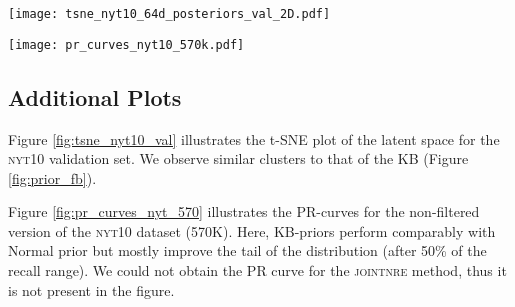 \documentclass[11pt]{article}
\begin{document}
\begin{figure*}[t!]
    \centering
    \begin{minipage}[c]{0.45\textwidth}
    \texttt{[image: tsne\_nyt10\_64d\_posteriors\_val\_2D.pdf]}
    \caption{t-SNE plot of the latent vector () for the \textsc{nyt10} (520K) validation set, when using KB priors during training.}
    \label{fig:tsne_nyt10_val}
    \end{minipage}\hspace{0.05\linewidth}
    \begin{minipage}[c]{0.45\textwidth}
\texttt{[image: pr\_curves\_nyt10\_570k.pdf]}
    \caption{Precision-Recall curves for the \textsc{nyt10} (570K) test set.}
    \label{fig:pr_curves_nyt_570}
    \end{minipage}
\end{figure*}


\subsection{Additional Plots}
\label{app:more_plots}

Figure \ref{fig:tsne_nyt10_val} illustrates the t-SNE plot of the latent space for the \textsc{nyt10} validation set. We observe similar clusters to that of the KB (Figure \ref{fig:prior_fb}).

Figure \ref{fig:pr_curves_nyt_570} illustrates the PR-curves for the non-filtered version of the \textsc{nyt10} dataset (570K). Here, KB-priors perform comparably with Normal prior but mostly improve the tail of the distribution (after 50\% of the recall range). We could not obtain the PR curve for the \textsc{jointnre} method, thus it is not present in the figure.
\end{document}
